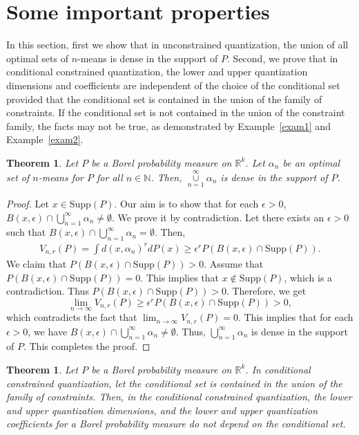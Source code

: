 \documentclass[12pt, reqno]{amsart}
\theoremstyle{plain}
\newtheorem{theorem}[subsection]{Theorem}
\theoremstyle{definition}
\newcommand{\uu}{\cup}%
\newcommand{\ii}{\cap}%
\newcommand{\UU}{\bigcup}%
\newcommand{\ga}{\alpha}
\newcommand{\D}[1]{\mathbb{#1}}%
\begin{document}
\section{Some important properties} \label{prop}
In this section, first we show that in unconstrained quantization, the union of all optimal sets of \( n \)-means is dense in the support of \( P \). Second, we prove that in conditional constrained quantization, the lower and upper quantization dimensions and coefficients are independent of the choice of the conditional set provided that the conditional set is contained in the union of the family of constraints. If the conditional set is not contained in the union of the constraint family, the facts may not be true, as demonstrated by Example~\ref{exam1} and Example~\ref{exam2}.
\begin{theorem} \label{TheoM1} 
Let $P$ be a Borel probability measure on $\D R^k$. Let $\ga_n$ be an optimal set of $n$-means for $P$ for all $n\in \D N$. Then, $\mathop{\uu}\limits_{n=1}^\infty \ga_n$ is dense in the support of $P$. 
\end{theorem} 
\begin{proof}
Let $x\in \text{Supp}(P)$. Our aim is to show that for each $\epsilon>0$,  $B(x,\epsilon)\ii\mathop{\UU}\limits_{n=1}^{\infty}\ga_n\ne \emptyset.$
We prove it by contradiction. Let there exists an $\epsilon>0$ such that $B(x,\epsilon)\ii \mathop{\UU}\limits_{n=1}^{\infty}\ga_n=\emptyset.$ Then, 
\begin{align*}
	V_{n,r}(P)=\int d(x,\ga_n)^{r} dP(x)\geq \epsilon^{r} P(B(x,\epsilon)\cap \text{Supp}(P)).
	\end{align*}
We claim that $P(B(x,\epsilon)\cap \text{Supp}(P))>0$. Assume that $P(B(x,\epsilon)\cap \text{Supp}(P))=0$.  This implies that $x\notin \text{Supp}(P)$, which is a contradiction. Thus  $P(B(x,\epsilon)\cap \text{Supp}(P))>0$.  Therefore, we get 
$$\lim_{n\to \infty}V_{n,r}(P)\geq \epsilon^{r} P(B(x,\epsilon)\cap \text{Supp}(P))>0,$$
which contradicts the fact that $\lim_{n\to \infty}V_{n,r}(P)=0$. This implies that for  each $\epsilon>0$,  we have $B(x,\epsilon)\cap \mathop {\UU}\limits_{n=1}^{\infty}\ga_n\ne \emptyset.$ Thus, $\mathop{\UU}\limits_{n=1}^\infty \ga_n$ is dense in the support of $P$. This completes the proof.
\end{proof} 



\begin{theorem} \label{TheoM2} 
Let $P$ be a Borel probability measure on $\D R^k$. In conditional constrained quantization, let the conditional set is contained in the union of the family of constraints. Then, in the conditional constrained quantization, the lower and upper quantization dimensions, and the lower and upper quantization coefficients for a Borel probability measure do not depend on the conditional set. 
\end{theorem} 
\end{document}
